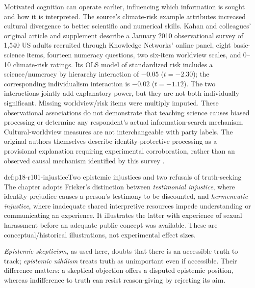 Motivated cognition can operate earlier, influencing which information
is sought and how it is interpreted. The source's climate-risk example
attributes increased cultural divergence to better scientific and numerical
skills. Kahan and colleagues' original article and supplement describe a
January 2010 observational survey of 1,540 US adults recruited through
Knowledge Networks' online panel, eight basic-science items, fourteen
numeracy questions, two six-item worldview scales, and 0--10 climate-risk
ratings. Its OLS model of standardized risk includes a science/numeracy
by hierarchy interaction of \(-0.05\) (\(t=-2.30\)); the corresponding
individualism interaction is \(-0.02\) (\(t=-1.12\)). The two
interactions jointly add explanatory power, but they are not both
individually significant. Missing worldview/risk items were multiply
imputed. These observational associations do not demonstrate that
teaching science causes biased processing or determine any respondent's
actual information-search mechanism. Cultural-worldview measures are
not interchangeable with party labels. The original authors themselves
describe identity-protective processing as a provisional explanation
requiring experimental corroboration, rather than an observed causal
mechanism identified by this survey
\parencite[author postprint, pp.~6--10]{KahanEtAl2012Climate}
\parencite[supplement, pp.~1--12, Tables S1--S4]{KahanEtAl2012Climate}
\parencite[p.~586]{DietrichSpiekermann2021Social}.

\begin{hbdefinition}{def:p18-r101-injustice}{Two epistemic injustices and two refusals of truth-seeking}
The chapter adopts Fricker's distinction between \emph{testimonial
injustice}, where identity prejudice causes a person's testimony to be
discounted, and \emph{hermeneutic injustice}, where inadequate shared
interpretive resources impede understanding or communicating an
experience. It illustrates the latter with experience of sexual
harassment before an adequate public concept was available. These are
conceptual/historical illustrations, not experimental effect sizes.

\emph{Epistemic skepticism}, as used here, doubts that there is an
accessible truth to track; \emph{epistemic nihilism} treats truth as
unimportant even if accessible. Their difference matters: a skeptical
objection offers a disputed epistemic position, whereas indifference to
truth can resist reason-giving by rejecting its aim.
\end{hbdefinition}

